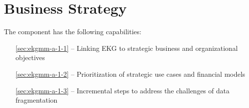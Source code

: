 \chapter{Business Strategy}\label{ch:ekgmm-a-1} %

The  component has the following capabilities:

\begin{itemize}[leftmargin=.5in]
  \item [\ref{sec:ekgmm-a-1-1}]  -- Linking EKG to strategic business and organizational objectives
  \item [\ref{sec:ekgmm-a-1-2}]  -- Prioritization of strategic use cases and financial models
  \item [\ref{sec:ekgmm-a-1-3}]  -- Incremental steps to address the challenges of data fragmentation
\end{itemize}




